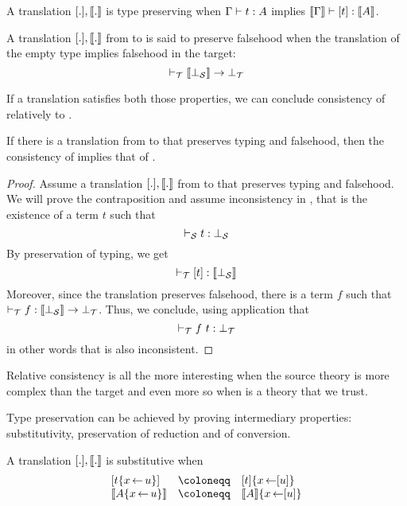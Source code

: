 \begin{definition}
  A translation \([.], \llbracket . \rrbracket\) is type preserving when
  \(\Gamma \vdash t : A\) implies \(\llbracket \Gamma \rrbracket \vdash [t] : \llbracket A \rrbracket\).
\end{definition}

\begin{definition}
  A translation \([.], \llbracket . \rrbracket\) from \cS to \cT is said to preserve
  falsehood when the translation of the empty type implies falsehood in the
  target:
  \[ \vdash_\mathcal{T} \llbracket \bot_\mathcal{S} \rrbracket \to \bot_\mathcal{T} \]
\end{definition}

If a translation satisfies both those properties, we can conclude consistency
of \cS relatively to \cT.

\begin{theorem}
  If there is a translation from \cS to \cT that preserves typing and
  falsehood, then the consistency of \cT implies that of \cS.
\end{theorem}

\begin{proof}
  Assume a translation \([.], \llbracket . \rrbracket\) from \cS to \cT that preserves typing
  and falsehood. We will prove the contraposition and assume inconsistency in
  \cS, that is the existence of a term \(t\) such that
  \[ \vdash_\mathcal{S} t : \bot_\mathcal{S} \]
  By preservation of typing, we get
  \[ \vdash_\mathcal{T} [t] : \llbracket \bot_\mathcal{S} \rrbracket \]
  Moreover, since the translation preserves falsehood, there is a term \(f\)
  such that \(\vdash_\mathcal{T} f : \llbracket \bot_\mathcal{S} \rrbracket \to \bot_\mathcal{T}\).
  Thus, we conclude, using application that
  \[ \vdash_\mathcal{T} f\ t : \bot_\mathcal{T} \]
  in other words that \cT is also inconsistent.
\end{proof}

Relative consistency is all the more interesting when the source theory is more
complex than the target and even more so when \cT is a theory that we trust.

Type preservation can be achieved by proving intermediary properties:
substitutivity, preservation of reduction and of conversion.

\begin{definition}[Substitutivity]
  A translation \([.], \llbracket . \rrbracket\) is substitutive when
  \[
    \begin{array}{lcl}
      [t\{x \sto u\}] &\coloneqq& [t]\{x \sto [u]\} \\
      \transl{A\{x \sto u\}} &\coloneqq& \transl{A}\{x \sto [u]\} \\
    \end{array}
  \]
\end{definition}

